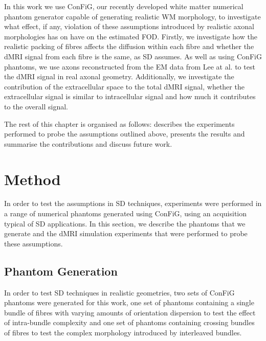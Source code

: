 In this work we use \ac{ConFiG}, our recently developed white matter numerical phantom generator capable of generating realistic WM morphology, to investigate what effect, if any, violation of these assumptions introduced by realistic axonal morphologies has on have on the estimated \ac{FOD}.%
Firstly, we investigate how the realistic packing of fibres affects the diffusion within each fibre and whether the dMRI signal from each fibre is the same, as \ac{SD} assumes.
As well as using \ac{ConFiG} phantoms, we use axons reconstructed from the \ac{EM} data from Lee at al. \cite{Lee2019b} to test the \ac{dMRI} signal in real axonal geometry.
Additionally, we investigate the contribution of the extracellular space to the total \ac{dMRI} signal, whether the extracellular signal is similar to intracellular signal and how much it contributes to the overall signal.

The rest of this chapter is organised as follows:  describes the experiments performed to probe the assumptions outlined above,  presents the results and  summarise the contributions and discuss future work.


\section{Method}
\label{sec:frf_method}
In order to test the assumptions in \ac{SD} techniques, experiments were performed in a range of numerical phantoms generated using ConFiG, using an acquisition typical of \ac{SD} applications. In this section, we describe the phantoms that we generate and the \ac{dMRI} simulation experiments that were performed to probe these assumptions.

\subsection{Phantom Generation}
\label{sec:frf_phantom_generation}
In order to test \ac{SD} techniques in realistic geometries, two sets of \ac{ConFiG} phantoms were generated for this work, one set of phantoms containing a single bundle of fibres with varying amounts of orientation dispersion to test the effect of intra-bundle complexity and one set of phantoms containing crossing bundles of fibres to test the complex morphology introduced by interleaved bundles.

